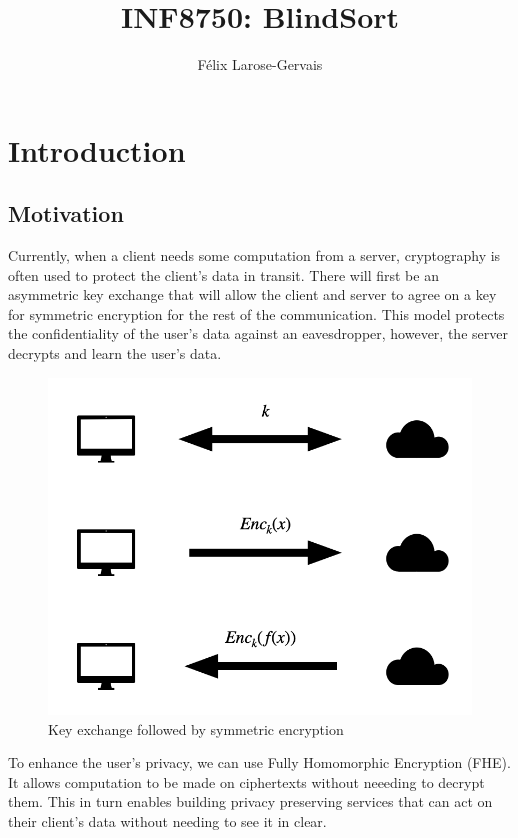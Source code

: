 \documentclass{article}
\title{INF8750: BlindSort}
\author{Félix Larose-Gervais}
\begin{document}
\maketitle
\newpage
\tableofcontents

\newpage

\section{Introduction}

\subsection{Motivation}

Currently, when a client needs some computation from a server, cryptography is often used to protect the client's data in transit. There will first be an asymmetric key exchange that will allow the client and server to agree on a key for symmetric encryption for the rest of the communication. This model protects the confidentiality of the user's data against an eavesdropper, however, the server decrypts and learn the user's data.

\begin{figure}[h]
    \centering
    \includegraphics[scale=0.3]{dh}
    \caption{Key exchange followed by symmetric encryption}
\end{figure}

To enhance the user's privacy, we can use Fully Homomorphic Encryption (FHE). It allows computation to be made on ciphertexts without neeeding to decrypt them. This in turn enables building privacy preserving services that can act on their client's data without needing to see it in clear.
\end{document}
